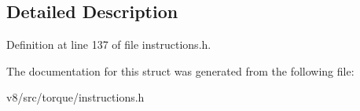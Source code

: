 \subsection{Detailed Description}


Definition at line 137 of file instructions.\+h.



The documentation for this struct was generated from the following file\+:\begin{DoxyCompactItemize}
\item 
v8/src/torque/instructions.\+h\end{DoxyCompactItemize}
